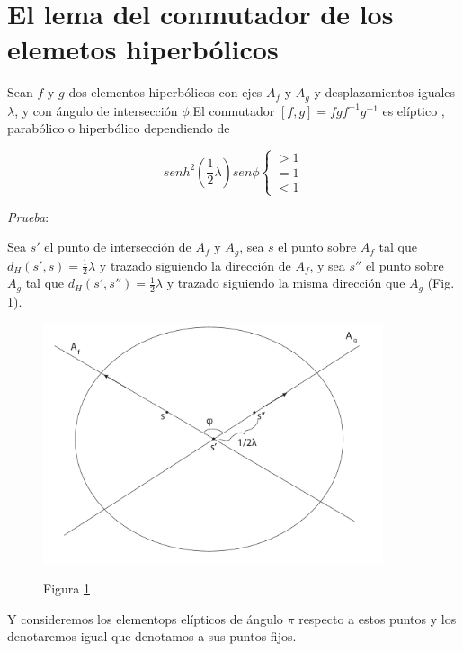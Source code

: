 \section{El lema del conmutador de los elemetos hiperb\'olicos}

\begin{lem} \label{lema2}
Sean $f$ y $g$ dos elementos hiperb\'olicos con ejes $A_{f}$ y
$A_{g}$ y desplazamientos iguales $\lambda $, y con \'angulo de
intersecci\'on $\phi $.El conmutador $[f,g]=fgf^{-1}g^{-1}$
es el\'iptico , parab\'olico o hiperb\'olico dependiendo de

$$ senh^{2}(\frac{1}{2} \lambda) sen \phi  \left \{ \begin{matrix} >1
\\ =1 \\ < 1 \end{matrix}\right. $$
\end{lem}

\textit{Prueba}:

Sea $s'$ el punto de intersecci\'on de $A_{f}$  y $A_{g}$, sea $s$
el punto sobre $A_{f}$ tal que $d_{H}(s',s)= \frac{1}{2} \lambda$ y
trazado siguiendo la direcci\'on de $A_{f}$, y sea $s''$ el punto
sobre $A_{g}$ tal que $d_{H}(s',s'')=\frac{1}{2} \lambda$ y trazado
siguiendo la misma direcci\'on que $A_{g}$ (Fig. \ref{lemma2-dibujo1}). \\

\begin{figure}[h]
  \centering
  \includegraphics[width=10cm]{lemma2-dibujo1}\\
  \caption{Figura \ref{lemma2-dibujo1}}\label{lemma2-dibujo1}
\end{figure}


Y consideremos los elementops el\'ipticos de \'angulo $\pi$  respecto a estos puntos
y los denotaremos igual que denotamos a sus puntos fijos. \\

